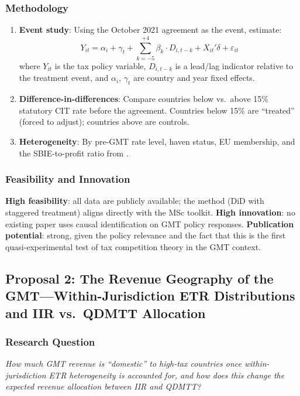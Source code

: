 \documentclass[11pt,a4paper]{article}
\begin{document}
\subsubsection{Methodology}
\begin{enumerate}[nosep]
    \item \textbf{Event study}: Using the October 2021 agreement as the event, estimate:
    \begin{equation}
    Y_{it} = \alpha_i + \gamma_t + \sum_{k=-5}^{+4} \beta_k \cdot D_{i,t-k} + X_{it}'\delta + \varepsilon_{it}
    \label{eq:eventstudy}
    \end{equation}
    where $Y_{it}$ is the tax policy variable, $D_{i,t-k}$ is a lead/lag indicator relative to the treatment event, and $\alpha_i$, $\gamma_t$ are country and year fixed effects.
    
    \item \textbf{Difference-in-differences}: Compare countries below vs.\ above 15\% statutory CIT rate before the agreement. Countries below 15\% are ``treated'' (forced to adjust); countries above are controls.
    
    \item \textbf{Heterogeneity}: By pre-GMT rate level, haven status, EU membership, and the SBIE-to-profit ratio from \citet{devereux2023}.
\end{enumerate}

\subsubsection{Feasibility and Innovation}
\textbf{High feasibility}: all data are publicly available; the method (DiD with staggered treatment) aligns directly with the MSc toolkit. \textbf{High innovation}: no existing paper uses causal identification on GMT policy responses. \textbf{Publication potential}: strong, given the policy relevance and the fact that this is the first quasi-experimental test of tax competition theory in the GMT context.


\subsection{Proposal 2: The Revenue Geography of the GMT---Within-Jurisdiction ETR Distributions and IIR vs.\ QDMTT Allocation}
\label{subsec:proposal2}

\subsubsection{Research Question}
\emph{How much GMT revenue is ``domestic'' to high-tax countries once within-jurisdiction ETR heterogeneity is accounted for, and how does this change the expected revenue allocation between IIR and QDMTT?}
\end{document}
